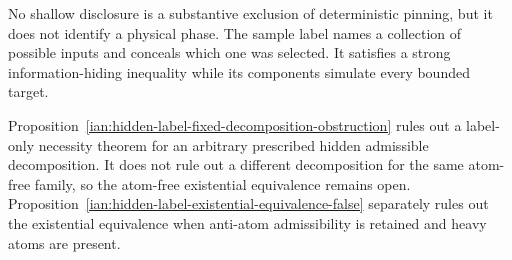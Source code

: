 \begin{remark}
\label{ian:hidden-label-synthetic-labels}
No shallow disclosure is a substantive exclusion of deterministic pinning, but it does not identify a physical phase. The sample label names a collection of possible inputs and conceals which one was selected. It satisfies a strong information-hiding inequality while its components simulate every bounded target.

Proposition~\ref{ian:hidden-label-fixed-decomposition-obstruction} rules out a label-only necessity theorem for an arbitrary prescribed hidden admissible decomposition. It does not rule out a different decomposition for the same atom-free family, so the atom-free existential equivalence remains open. Proposition~\ref{ian:hidden-label-existential-equivalence-false} separately rules out the existential equivalence when anti-atom admissibility is retained and heavy atoms are present.
\end{remark}

